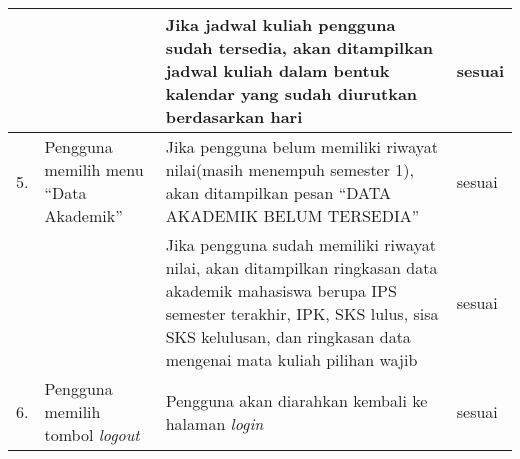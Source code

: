 \begin{table}[H]
\begin{tabular}{|p{0.5cm}| p{4cm}| p{7cm}| p{1.75cm}|}
					&	&	Jika jadwal kuliah pengguna sudah tersedia, akan ditampilkan jadwal kuliah dalam bentuk kalendar yang sudah diurutkan berdasarkan hari &	sesuai	\\ \hline
				5.	&	Pengguna memilih menu ``Data Akademik'' &	Jika pengguna belum memiliki riwayat nilai(masih menempuh semester 1), akan ditampilkan pesan ``DATA AKADEMIK BELUM TERSEDIA'' &	sesuai	\\ \hline
					&	&	Jika pengguna sudah memiliki riwayat nilai, akan ditampilkan ringkasan data akademik mahasiswa berupa IPS semester terakhir, IPK, SKS lulus, sisa SKS kelulusan, dan ringkasan data mengenai mata kuliah pilihan wajib &	sesuai	\\ \hline
				6.	&	Pengguna memilih tombol \textit{logout}	&	Pengguna akan diarahkan kembali ke halaman \textit{login} &	sesuai	\\ \hline
				\end{tabular}
				\label{table:hasilFungsional}
			\end{table}